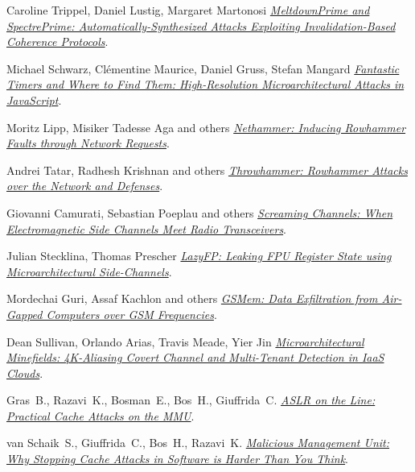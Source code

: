 \begin{frame}[allowframebreaks]
\begin{thebibliography}{10}
    Caroline Trippel, Daniel Lustig, Margaret Martonosi
    \newblock \href{https://arxiv.org/abs/1802.03802}{\em MeltdownPrime and SpectrePrime: Automatically-Synthesized Attacks Exploiting Invalidation-Based Coherence Protocols}.

    Michael Schwarz, Clémentine Maurice, Daniel Gruss, Stefan Mangard
    \newblock \href{https://gruss.cc/files/fantastictimers.pdf}{\em Fantastic Timers and Where to Find Them: High-Resolution Microarchitectural Attacks in JavaScript}.

    Moritz Lipp, Misiker Tadesse Aga and others
    \newblock \href{https://arxiv.org/abs/1805.04956}{\em Nethammer: Inducing Rowhammer Faults through Network Requests}.

    Andrei Tatar, Radhesh Krishnan and others
    \newblock \href{https://www.cs.vu.nl/~herbertb/download/papers/throwhammer_atc18.pdf}{\em Throwhammer: Rowhammer Attacks over the Network and Defenses}.

    Giovanni Camurati, Sebastian Poeplau and others
    \newblock \href{http://s3.eurecom.fr/tools/screaming_channels/}{\em Screaming Channels: When Electromagnetic Side Channels Meet Radio Transceivers}.

    Julian Stecklina, Thomas Prescher
    \newblock \href{https://blog.cyberus-technology.de/images/lazyFP.pdf}{\em LazyFP: Leaking FPU Register State using Microarchitectural Side-Channels}.

    Mordechai Guri, Assaf Kachlon and others
    \newblock \href{https://www.usenix.org/conference/usenixsecurity15/technical-sessions/presentation/guri}{\em GSMem: Data Exfiltration from Air-Gapped Computers over GSM Frequencies}.

    Dean Sullivan, Orlando Arias, Travis Meade, Yier Jin
    \newblock \href{http://wp.internetsociety.org/ndss/wp-content/uploads/sites/25/2018/03/NDSS2018-06A-3_Sullivan_Slides.pdf}{\em Microarchitectural Minefields: 4K-Aliasing Covert Channel and Multi-Tenant Detection in IaaS Clouds}.

    Gras~B., Razavi~K., Bosman~E., Bos~H., Giuffrida~C.
    \newblock \href{https://www.vusec.net/download/?t=papers/anc_ndss17.pdf}{\em ASLR on the Line: Practical Cache Attacks on the MMU}.

    van Schaik~S., Giuffrida~C., Bos~H., Razavi~K.
    \newblock \href{https://bibbase.org/network/publication/vanschaik-giuffrida-bos-razavi-maliciousmanagementunitwhystoppingcacheattacksinsoftwareisharderthanyouthink-2018}{\em Malicious Management Unit: Why Stopping Cache Attacks in Software is Harder Than You Think}.


\end{thebibliography}
\end{frame}

